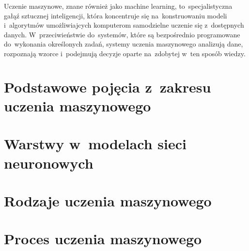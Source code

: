 Uczenie maszynowe, znane również jako machine learning, to~specjalistyczna gałąź sztucznej inteligencji,
która koncentruje się na~konstruowaniu modeli i~algorytmów umożliwiajcych komputerom samodzielne uczenie się z~dostępnych danych.
W~przeciwieństwie do~systemów, które są bezpośrednio programowane do~wykonania określonych zadań,
systemy uczenia maszynowego analizują dane, rozpoznają wzorce i~podejmują decyzje oparte na~zdobytej w~ten sposób wiedzy.

\section{Podstawowe pojęcia z~zakresu uczenia maszynowego}


\section{Warstwy w~modelach sieci neuronowych}


\section{Rodzaje uczenia maszynowego}


\section{Proces uczenia maszynowego}
